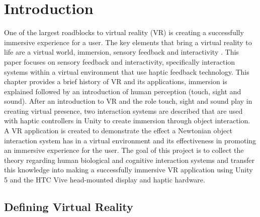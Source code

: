 
\chapter{Introduction}\label{intro}





One of the largest roadblocks to virtual reality (VR) is creating a successfully immersive experience for a user. The key elements that bring a virtual reality to life  are a virtual world, immersion, sensory feedback and interactivity \cite{sherman}. This paper focuses on sensory feedback and interactivity, specifically interaction systems within a virtual environment that use haptic feedback technology. This chapter provides a brief history of VR and its applications, immersion is explained followed by an introduction of human perception (touch, sight and sound). After an introduction to VR and the role touch, sight and sound play in creating virtual presence, two interaction systems are described that are used with haptic controllers in Unity to create immersion through object interaction. A VR application is created to demonstrate the effect a Newtonian object interaction system has in a virtual environment and its effectiveness in promoting an immersive experience for the user. The goal of this project is to collect the theory regarding human biological and cognitive interaction systems and transfer this knowledge into making a successfully immersive VR application using Unity 5 and the HTC Vive head-mounted display and haptic hardware.





\section{Defining Virtual Reality}\label{defining VR}

